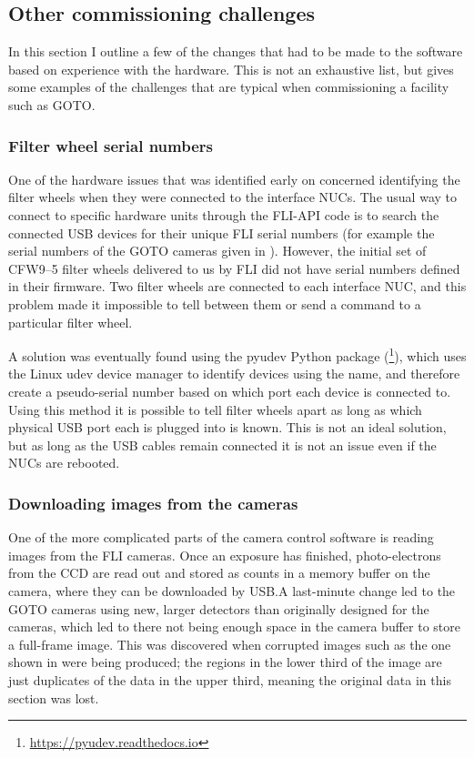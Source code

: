 \subsection{Other commissioning challenges}
\label{sec:challenges}
\begin{colsection}

In this section I outline a few of the changes that had to be made to the software based on experience with the hardware. This is not an exhaustive list, but gives some examples of the challenges that are typical when commissioning a facility such as GOTO.\@

\subsubsection{Filter wheel serial numbers}

One of the hardware issues that was identified early on concerned identifying the filter wheels when they were connected to the interface NUCs. The usual way to connect to specific hardware units through the FLI-API code is to search the connected USB devices for their unique FLI serial numbers (for example the serial numbers of the GOTO cameras given in ). However, the initial set of CFW9--5 filter wheels delivered to us by FLI did not have serial numbers defined in their firmware. Two filter wheels are connected to each interface NUC, and this problem made it impossible to tell between them or send a command to a particular filter wheel.

A solution was eventually found using the pyudev Python package (\footnote{\url{https://pyudev.readthedocs.io}}), which uses the Linux udev device manager to identify devices using the  name, and therefore create a pseudo-serial number based on which port each device is connected to. Using this method it is possible to tell filter wheels apart as long as which physical USB port each is plugged into is known. This is not an ideal solution, but as long as the USB cables remain connected it is not an issue even if the NUCs are rebooted.

\subsubsection{Downloading images from the cameras}

One of the more complicated parts of the camera control software is reading images from the FLI cameras. Once an exposure has finished, photo-electrons from the CCD are read out and stored as counts in a memory buffer on the camera, where they can be downloaded by USB.\@ A last-minute change led to the GOTO cameras using new, larger detectors than originally designed for the cameras, which led to there not being enough space in the camera buffer to store a full-frame image. This was discovered when corrupted images such as the one shown in  were being produced; the regions in the lower third of the image are just duplicates of the data in the upper third, meaning the original data in this section was lost.


\end{colsection}
